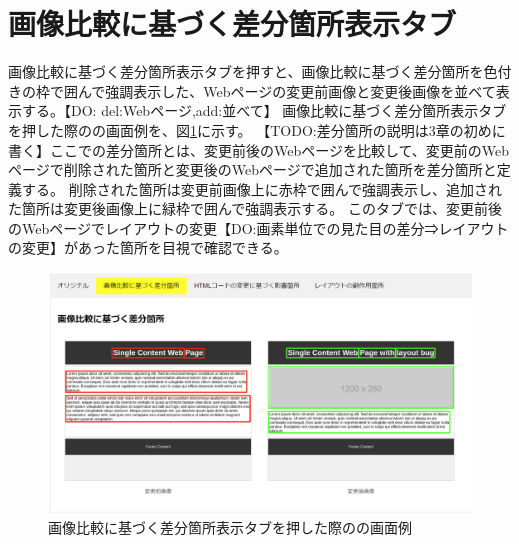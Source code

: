 \section{画像比較に基づく差分箇所表示タブ}\label{sec:images_tab}
画像比較に基づく差分箇所表示タブを押すと、画像比較に基づく差分箇所を色付きの枠で囲んで強調表示した、Webページの変更前画像と変更後画像を並べて表示する。【DO: del:Webページ,add:並べて】
画像比較に基づく差分箇所表示タブを押した際の\toolName の画面例を、図\ref{fig: Appearance_images_tab}に示す。
【TODO:差分箇所の説明は3章の初めに書く】ここでの差分箇所とは、変更前後のWebページを比較して、変更前のWebページで削除された箇所と変更後のWebページで追加された箇所を差分箇所と定義する。
削除された箇所は変更前画像上に赤枠で囲んで強調表示し、追加された箇所は変更後画像上に緑枠で囲んで強調表示する。
このタブでは、変更前後のWebページでレイアウトの変更【DO:画素単位での見た目の差分⇒レイアウトの変更】があった箇所を目視で確認できる。
\begin{figure}[tp]
    \begin{center}
        \includegraphics[width=1.0\columnwidth]{image/3_images_tab.png}
        \caption{画像比較に基づく差分箇所表示タブを押した際の\toolName の画面例}
        \label{fig: Appearance_images_tab}
    \end{center}
\end{figure}



